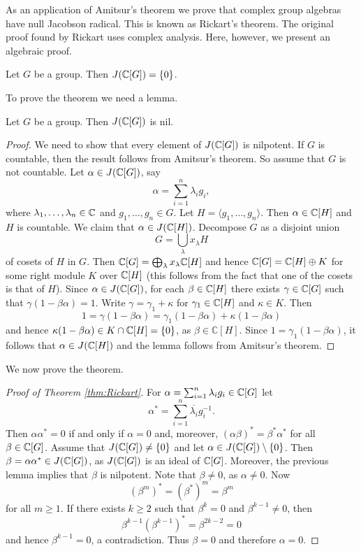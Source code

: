 As an application of Amitsur's theorem we prove that 
complex group algebras have null Jacobson radical.
This is known as 
Rickart's theorem. The original proof found by Rickart 
uses complex analysis. Here, however, 
we present an algebraic proof. 


\begin{theorem}[Rickart]
\label{thm:Rickart}
    Let $G$ be a group. Then $J(\mathbb{C}[G])=\{0\}$.
\end{theorem}

To prove the theorem we need a lemma.

\begin{lemma}
Let $G$ be a group. Then $J(\mathbb{C}[G])$ is nil.        
\end{lemma}

\begin{proof}
    We need to show that every element of $J(\mathbb{C}[G])$ is nilpotent. 
    If $G$ is countable, then the result follows from Amitsur's theorem. So assume that 
    $G$ is not countable. Let $\alpha\in J(\mathbb{C}[G])$, say
    \[
    \alpha=\sum_{i=1}^n\lambda_ig_i,
    \]
    where $\lambda_1,\dots,\lambda_n\in\mathbb{C}$ and $g_1,\dots,g_n\in G$. Let $H=\langle g_1,\dots,g_n\rangle$.
    Then $\alpha\in \mathbb{C}[H]$ and $H$ is countable. We claim that $\alpha\in J(\mathbb{C}[H])$. Decompose
    $G$ as a disjoint union 
    \[
    G=\bigcup_\lambda x_\lambda H
    \]
    of cosets of $H$ in $G$. Then $\mathbb{C}[G]=\bigoplus_\lambda x_\lambda\mathbb{C}[H]$ and
    hence $\mathbb{C}[G]=\mathbb{C}[H]\oplus K$ for some right module $K$ over $\mathbb{C}[H]$ (this follows
    from the fact that one of the cosets is that of $H$). Since $\alpha\in J(\mathbb{C}[G])$, for each 
    $\beta\in\mathbb{C}[H]$ there exists $\gamma\in\mathbb{C}[G]$ such that 
    $\gamma(1-\beta\alpha)=1$. Write $\gamma=\gamma_1+\kappa$ for $\gamma_1\in\mathbb{C}[H]$ and $\kappa\in K$. Then
    \[
    1=\gamma(1-\beta\alpha)=\gamma_1(1-\beta\alpha)+\kappa(1-\beta\alpha)
    \]
    and hence $\kappa(1-\beta\alpha)\in K\cap \mathbb{C}[H]=\{0\}$, as $\beta\in\mathbb{C}[H]$. 
    Since $1=\gamma_1(1-\beta\alpha)$, it follows that
    $\alpha\in J(\mathbb{C}[H])$ and the lemma follows from Amitsur's theorem.  
\end{proof}

We now prove the theorem. 

\begin{proof}[Proof of Theorem \ref{thm:Rickart}]
    For $\alpha=\sum_{i=1}^n\lambda_ig_i\in\mathbb{C}[G]$ let 
    \[
    \alpha^*=\sum_{i=1}^n\overline{\lambda_i}g_i^{-1}.
    \]
    Then $\alpha\alpha^*=0$ if and only if $\alpha=0$ and, moreover, 
    $(\alpha\beta)^*=\beta^*\alpha^*$ for all $\beta\in\mathbb{C}[G]$. 
    Assume that $J(\mathbb{C}[G])\ne\{0\}$ and let $\alpha\in J(\mathbb{C}[G])\setminus\{0\}$. Then
    $\beta=\alpha\alpha^*\in J(\mathbb{C}[G])$, as $J(\mathbb{C}[G])$ is an ideal of $\mathbb{C}[G]$. Moreover, the previous 
    lemma implies that $\beta$ is nilpotent. Note that $\beta\ne 0$, as $\alpha\ne0$. Now  
    \[
    (\beta^m)^*=(\beta^*)^m=\beta^m
    \]
    for all $m\geq1$. If there exists $k\geq2$ such that $\beta^k=0$ and $\beta^{k-1}\ne 0$, then
    \[
    \beta^{k-1}\left(\beta^{k-1}\right)^*=\beta^{2k-2}=0
    \]
    and hence $\beta^{k-1}=0$, a contradiction. Thus $\beta=0$ and therefore $\alpha=0$. 
\end{proof}

